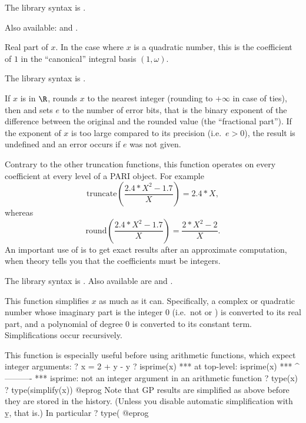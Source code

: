 The library syntax is .

 Also available:  and .

\label{se:real}
Real part of $x$. In the case where $x$ is a quadratic number, this is the
coefficient of $1$ in the ``canonical'' integral basis $(1,\omega)$.

The library syntax is .

\label{se:round}
If $x$ is in $\R$, rounds $x$ to the nearest integer (rounding to
$+\infty$ in case of ties), then and sets $e$ to the number of error bits,
that is the binary exponent of the difference between the original and the
rounded value (the ``fractional part''). If the exponent of $x$ is too large
compared to its precision (i.e.~$e>0$), the result is undefined and an error
occurs if $e$ was not given.

 Contrary to the other truncation functions,
this function operates on every coefficient at every level of a PARI object.
For example
$$\text{truncate}\left(\dfrac{2.4*X^2-1.7}{X}\right)=2.4*X,$$
whereas
$$\text{round}\left(\dfrac{2.4*X^2-1.7}{X}\right)=\dfrac{2*X^2-2}{X}.$$
An important use of  is to get exact results after an approximate
computation, when theory tells you that the coefficients must be integers.

The library syntax is .
Also available are  and
.

\label{se:simplify}
This function simplifies $x$ as much as it can. Specifically, a complex or
quadratic number whose imaginary part is the integer 0 (i.e.~not 
or ) is converted to its real part, and a polynomial of degree $0$
is converted to its constant term. Simplifications occur recursively.

This function is especially useful before using arithmetic functions,
which expect integer arguments:
\bprog
? x = 2 + y - y
? isprime(x)
  ***   at top-level: isprime(x)
  ***                 ^----------
  *** isprime: not an integer argument in an arithmetic function
? type(x)
? type(simplify(x))
@eprog
Note that GP results are simplified as above before they are stored in the
history. (Unless you disable automatic simplification with \b{y}, that is.)
In particular
\bprog
? type(%
@eprog

